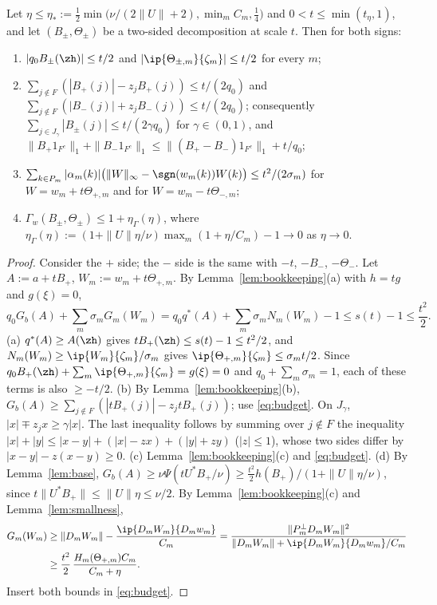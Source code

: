 \begin{lemma}\label{lem:budget}
Let $\eta\le\eta_*:=\frac12\min\big(\nu/(2\|U\|+2),\min_mC_m,\frac14\big)$
and $0<t\le\min(t_\eta,1)$, and let $(B_\pm,\Theta_\pm)$ be a two-sided
decomposition at scale $t$.  Then for both signs:
\begin{enumerate}
\item[(a)] $|q_0B_\pm(\zh)|\le t/2$ and $|\ip{\Theta_{\pm,m}}{\zeta_m}|\le
t/2$ for every $m$;
\item[(b)] $\sum_{j\notin F}(|B_+(j)|-z_jB_+(j))\le t/(2q_0)$ and
$\sum_{j\notin F}(|B_-(j)|+z_jB_-(j))\le t/(2q_0)$; consequently
$\sum_{j\in J_\gamma}|B_\pm(j)|\le t/(2\gamma q_0)$ for $\gamma\in(0,1)$, and
$\|B_+1_{F^c}\|_1+\|B_-1_{F^c}\|_1\le\|(B_+-B_-)1_{F^c}\|_1+t/q_0$;
\item[(c)] $\sum_{k\in P_m}|\alpha_m(k)|\big(\|W\|_\infty-\sgn(w_m(k))W(k)
\big)\le t^2/(2\sigma_m)$ for $W=w_m+t\Theta_{+,m}$ and for
$W=w_m-t\Theta_{-,m}$;
\item[(d)] $\Gamma_w(B_\pm,\Theta_\pm)\le1+\eta_\Gamma(\eta)$, where
$\eta_\Gamma(\eta):=(1+\|U\|\eta/\nu)\max_m(1+\eta/C_m)-1\to0$ as $\eta\to0$.
\end{enumerate}
\end{lemma}

\begin{proof}
Consider the $+$ side; the $-$ side is the same with $-t$, $-B_-$,
$-\Theta_-$.  Let $A:=a+tB_+$, $W_m:=w_m+t\Theta_{+,m}$.  By
Lemma~\ref{lem:bookkeeping}(a) with $h=tg$ and $g(\xi)=0$,
\begin{equation}\label{eq:budget}
 q_0G_b(A)+\sum_m\sigma_mG_m(W_m)=q_0q^*(A)+\sum_m\sigma_mN_m(W_m)-1\le
 s(t)-1\le\frac{t^2}2 .
\end{equation}
(a) $q^*(A)\ge A(\zh)$ gives $tB_+(\zh)\le s(t)-1\le t^2/2$, and
$N_m(W_m)\ge\ip{W_m}{\zeta_m}/\sigma_m$ gives $\ip{\Theta_{+,m}}{\zeta_m}\le
\sigma_mt/2$.  Since $q_0B_+(\zh)+\sum_m\ip{\Theta_{+,m}}{\zeta_m}=g(\xi)=0$
and $q_0+\sum_m\sigma_m=1$, each of these terms is also $\ge-t/2$.
(b) By Lemma~\ref{lem:bookkeeping}(b), $G_b(A)\ge\sum_{j\notin F}(|tB_+(j)|-
z_jtB_+(j))$; use \eqref{eq:budget}.  On $J_\gamma$, $|x|\mp z_jx\ge\gamma|x|$.
The last inequality follows by summing over $j\notin F$ the inequality
$|x|+|y|\le|x-y|+(|x|-zx)+(|y|+zy)$ ($|z|\le1$), whose two sides differ by
$|x-y|-z(x-y)\ge0$.
(c) Lemma~\ref{lem:bookkeeping}(c) and \eqref{eq:budget}.
(d) By Lemma~\ref{lem:base}, $G_b(A)\ge\nu\Psi(tU^*B_+/\nu)\ge\frac{t^2}2
h(B_+)/(1+\|U\|\eta/\nu)$, since $t\|U^*B_+\|\le\|U\|\eta\le\nu/2$.  By
Lemma~\ref{lem:bookkeeping}(c) and Lemma~\ref{lem:smallness},
\begin{align*}
 G_m(W_m)&\ge\|D_mW_m\|-\frac{\ip{D_mW_m}{D_mw_m}}{C_m}=
 \frac{\|P^\perp_mD_mW_m\|^2}{\|D_mW_m\|+\ip{D_mW_m}{D_mw_m}/C_m}\\
 &\ge\frac{t^2}2\,\frac{H_m(\Theta_{+,m})C_m}{C_m+\eta}.
\end{align*}
Insert both bounds in \eqref{eq:budget}.
\end{proof}

